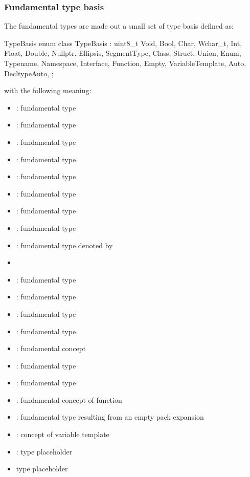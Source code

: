 
\subsubsection{Fundamental type basis}
\label{sec:ifc-fundamental-type-basis}

The fundamental types are made out a small set of type basis defined as:
%
\begin{typedef}{TypeBasis}{}
	enum class TypeBasis : uint8_t {
		Void,
		Bool,
		Char,
		Wchar_t,
		Int,
		Float,
		Double,
		Nullptr,
		Ellipsis,
		SegmentType,
		Class,
		Struct,
		Union,
		Enum,
		Typename,
		Namespace,
		Interface,
		Function,
		Empty,
		VariableTemplate,
		Auto,
		DecltypeAuto,
	};
\end{typedef}
%
with the following meaning:
\begin{itemize}
  \item {}: fundamental type 
  \item {}: fundamental type 
  \item {}: fundamental type 
  \item {}: fundamental type 
  \item {}: fundamental type 
  \item {}: fundamental type 
  \item {}: fundamental type 
  \item {}: fundamental type 
  \item {}: fundamental type denoted by 
  \item {}
  \item {}: fundamental type 
  \item {}: fundamental type 
  \item {}: fundamental type 
  \item {}: fundamental type 
  \item {}: fundamental concept 
  \item {}: fundamental type 
  \item {}: fundamental type 
  \item {}: fundamental concept of function
  \item {}: fundamental type resulting from an empty pack expansion
  \item {}: concept of variable template
  \item {}: type placeholder 
  \item {} type placeholder 
\end{itemize}


